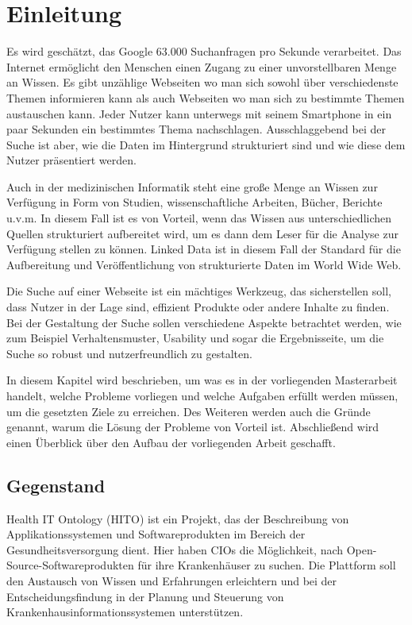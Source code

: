 \chapter{Einleitung}\label{ch:introduction}

Es wird geschätzt, das Google 63.000 Suchanfragen pro Sekunde verarbeitet. Das Internet ermöglicht den Menschen einen Zugang zu einer unvorstellbaren Menge an Wissen. Es gibt unzählige Webseiten wo man sich sowohl über verschiedenste Themen informieren kann als auch Webseiten wo man sich zu bestimmte Themen austauschen kann. Jeder Nutzer kann unterwegs mit seinem Smartphone in ein paar Sekunden ein bestimmtes Thema nachschlagen. Ausschlaggebend bei der Suche ist aber, wie die Daten im Hintergrund strukturiert sind und wie diese dem Nutzer präsentiert werden.

Auch in der medizinischen Informatik steht eine große Menge an Wissen zur Verfügung in Form von Studien, wissenschaftliche Arbeiten, Bücher, Berichte u.v.m. In diesem Fall ist es von Vorteil, wenn das Wissen aus unterschiedlichen Quellen strukturiert aufbereitet wird, um es dann dem Leser für die Analyse zur Verfügung stellen zu können. Linked Data ist in diesem Fall der Standard für die Aufbereitung und Veröffentlichung von strukturierte Daten im World Wide Web. 

Die Suche auf einer Webseite ist ein mächtiges Werkzeug, das sicherstellen soll, dass Nutzer in der Lage sind, effizient Produkte oder andere Inhalte zu finden. Bei der Gestaltung der Suche sollen verschiedene Aspekte betrachtet werden, wie zum Beispiel Verhaltensmuster, Usability und sogar die Ergebnisseite, um die Suche so robust und nutzerfreundlich zu gestalten.

In diesem Kapitel wird beschrieben, um was es in der vorliegenden Masterarbeit handelt, welche Probleme vorliegen und welche Aufgaben erfüllt werden müssen, um die gesetzten Ziele zu erreichen. Des Weiteren werden auch die Gründe genannt, warum die Lösung der Probleme von Vorteil ist. Abschließend wird einen Überblick über den Aufbau der vorliegenden Arbeit geschafft.


\section{Gegenstand}\label{sec:gegenstand}

Health IT Ontology (HITO) ist ein Projekt, das der Beschreibung von Applikationssystemen und Softwareprodukten im Bereich der Gesundheitsversorgung dient. Hier haben CIOs die Möglichkeit, nach Open-Source-Softwareprodukten für ihre Krankenhäuser zu suchen. Die Plattform soll den Austausch von Wissen und Erfahrungen erleichtern und bei der Entscheidungsfindung in der Planung und Steuerung von Krankenhausinformationssystemen unterstützen.

